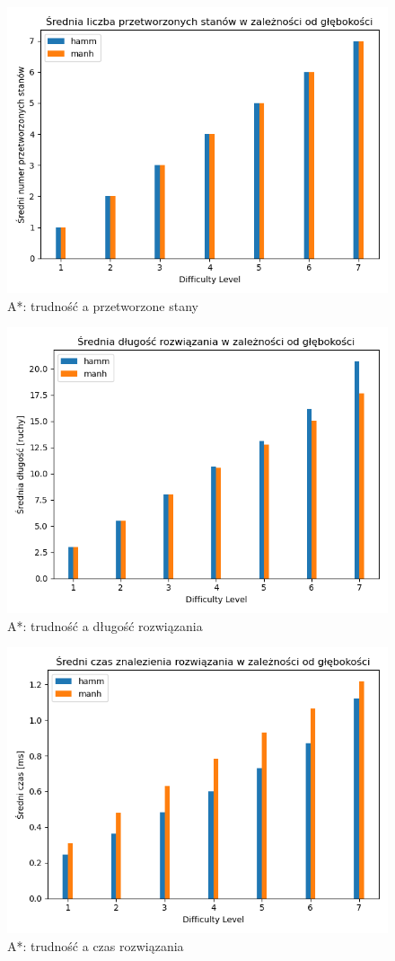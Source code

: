 \documentclass{classrep}
\begin{document}
\begin{figure}[p] \centering
 \includegraphics[width=0.9\linewidth]{./pic/astr_proc_c_vs_diff.png}
 \caption{A*: trudność a przetworzone stany}
\end{figure}
\begin{figure}[p] \centering
 \includegraphics[width=0.9\linewidth]{./pic/astr_sol_len_vs_diff.png}
 \caption{A*: trudność a długość rozwiązania}
\end{figure}
\begin{figure}[p] \centering
 \includegraphics[width=0.9\linewidth]{./pic/astr_time_vs_diff.png}
 \caption{A*: trudność a czas rozwiązania}
\end{figure}
\end{document}
